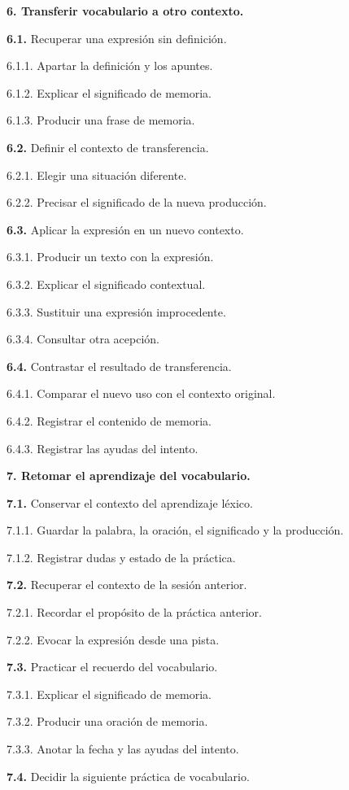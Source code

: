 \documentclass[10pt,a4paper]{article}
\newcommand{\HTAline}[3]{\par\noindent\hspace*{#1cm}\begin{minipage}{\dimexpr\linewidth-#1cm\relax}#3 #2\end{minipage}\par}
\begin{document}
\HTAline{0.0}{\textbf{6. Transferir vocabulario a otro contexto.}}{}
\HTAline{0.4}{\textbf{6.1.} Recuperar una expresión sin definición.}{}
\HTAline{0.8}{6.1.1. Apartar la definición y los apuntes.}{}
\HTAline{0.8}{6.1.2. Explicar el significado de memoria.}{}
\HTAline{0.8}{6.1.3. Producir una frase de memoria.}{}
\HTAline{0.4}{\textbf{6.2.} Definir el contexto de transferencia.}{}
\HTAline{0.8}{6.2.1. Elegir una situación diferente.}{}
\HTAline{0.8}{6.2.2. Precisar el significado de la nueva producción.}{}
\HTAline{0.4}{\textbf{6.3.} Aplicar la expresión en un nuevo contexto.}{}
\HTAline{0.8}{6.3.1. Producir un texto con la expresión.}{}
\HTAline{0.8}{6.3.2. Explicar el significado contextual.}{}
\HTAline{0.8}{6.3.3. Sustituir una expresión improcedente.}{}
\HTAline{0.8}{6.3.4. Consultar otra acepción.}{}
\HTAline{0.4}{\textbf{6.4.} Contrastar el resultado de transferencia.}{}
\HTAline{0.8}{6.4.1. Comparar el nuevo uso con el contexto original.}{}
\HTAline{0.8}{6.4.2. Registrar el contenido de memoria.}{}
\HTAline{0.8}{6.4.3. Registrar las ayudas del intento.}{}
\HTAline{0.0}{\textbf{7. Retomar el aprendizaje del vocabulario.}}{}
\HTAline{0.4}{\textbf{7.1.} Conservar el contexto del aprendizaje léxico.}{}
\HTAline{0.8}{7.1.1. Guardar la palabra, la oración, el significado y la producción.}{}
\HTAline{0.8}{7.1.2. Registrar dudas y estado de la práctica.}{}
\HTAline{0.4}{\textbf{7.2.} Recuperar el contexto de la sesión anterior.}{}
\HTAline{0.8}{7.2.1. Recordar el propósito de la práctica anterior.}{}
\HTAline{0.8}{7.2.2. Evocar la expresión desde una pista.}{}
\HTAline{0.4}{\textbf{7.3.} Practicar el recuerdo del vocabulario.}{}
\HTAline{0.8}{7.3.1. Explicar el significado de memoria.}{}
\HTAline{0.8}{7.3.2. Producir una oración de memoria.}{}
\HTAline{0.8}{7.3.3. Anotar la fecha y las ayudas del intento.}{}
\HTAline{0.4}{\textbf{7.4.} Decidir la siguiente práctica de vocabulario.}{}
\end{document}
